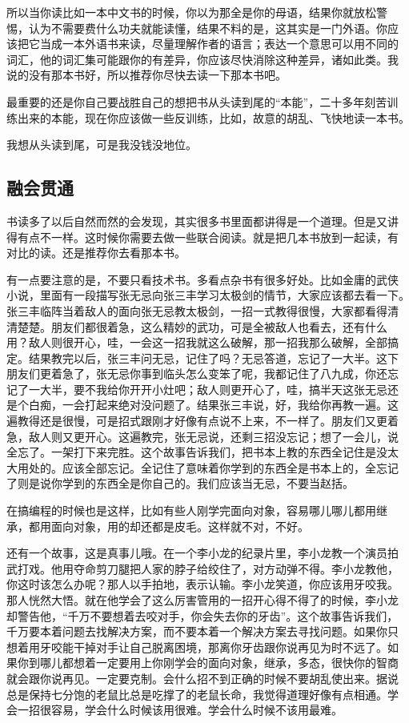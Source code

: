 \documentclass[10pt]{article}
\begin{document}
\begin{CJK*}{UTF8}{simhei}
所以当你读比如一本中文书的时候，你以为那全是你的母语，结果你就放松警
惕，认为不需要费什么功夫就能读懂，结果不料的是，这其实是一门外语。你应
该把它当成一本外语书来读，尽量理解作者的语言；表达一个意思可以用不同的
词汇，他的词汇集可能跟你的有差异，你应该尽快消除这种差异，诸如此类。我
说的没有那本书好，所以推荐你尽快去读一下那本书吧。

最重要的还是你自己要战胜自己的想把书从头读到尾的“本能”，二十多年刻苦训
练出来的本能，现在你应该做一些反训练，比如，故意的胡乱、飞快地读一本书。

我想从头读到尾，可是我没钱没地位。

\subsection{融会贯通}

书读多了以后自然而然的会发现，其实很多书里面都讲得是一个道理。但是又讲
得有点不一样。这时候你需要去做一些联合阅读。就是把几本书放到一起读，有
对比的读。还是推荐你去看那本书。

有一点要注意的是，不要只看技术书。多看点杂书有很多好处。比如金庸的武侠
小说，里面有一段描写张无忌向张三丰学习太极剑的情节，大家应该都去看一下。
张三丰临阵当着敌人的面向张无忌教太极剑，一招一式教得很慢，大家都看得清
清楚楚。朋友们都很着急，这么精妙的武功，可是全被敌人也看去，还有什么
用？敌人则很开心，哇，一会这一招我就这么破解，那一招我那么破解，全部搞
定。结果教完以后，张三丰问无忌，记住了吗？无忌答道，忘记了一大半。这下
朋友们更着急了，张无忌你事到临头怎么变笨了呢，我都记住了八九成，你还忘
记了一大半，要不我给你开开小灶吧；敌人则更开心了，哇，搞半天这张无忌还
是个白痴，一会打起来绝对没问题了。结果张三丰说，好，我给你再教一遍。这
遍教得还是很慢，可是招式跟刚才好像有点说不上来，不一样了。朋友们又更着
急，敌人则又更开心。这遍教完，张无忌说，还剩三招没忘记；想了一会儿，说
全忘了。一架打下来完胜。这个故事告诉我们，把书本上教的东西全记住是没太
大用处的。应该全部忘记。全记住了意味着你学到的东西全是书本上的，全忘记
了则是说你学到的东西全是你自己的。我们应该当无忌，不要当赵括。

在搞编程的时候也是这样，比如有些人刚学完面向对象，容易哪儿哪儿都用继
承，都用面向对象，用的却还都是皮毛。这样就不对，不好。

还有一个故事，这是真事儿哦。在一个李小龙的纪录片里，李小龙教一个演员拍
武打戏。他用夺命剪刀腿把人家的脖子给绞住了，对方动弹不得。李小龙教他，
你这时该怎么办呢？那人以手拍地，表示认输。李小龙笑道，你应该用牙咬我。
那人恍然大悟。就在他学会了这么厉害管用的一招开心得不得了的时候，李小龙
却警告他，“千万不要想着去咬对手，你会失去你的牙齿”。这个故事告诉我们，
千万要本着问题去找解决方案，而不要本着一个解决方案去寻找问题。如果你只
想着用牙咬能干掉对手让自己脱离困境，那离你牙齿跟你说再见为时不远了。如
果你到哪儿都想着一定要用上你刚学会的面向对象，继承，多态，很快你的智商
就会跟你说再见。一定要克制。会什么招不到正确的时候不要胡乱使出来。据说
总是保持七分饱的老鼠比总是吃撑了的老鼠长命，我觉得道理好像有点相通。学
会一招很容易，学会什么时候该用很难。学会什么时候不该用最难。


\end{CJK*}
\end{document}
